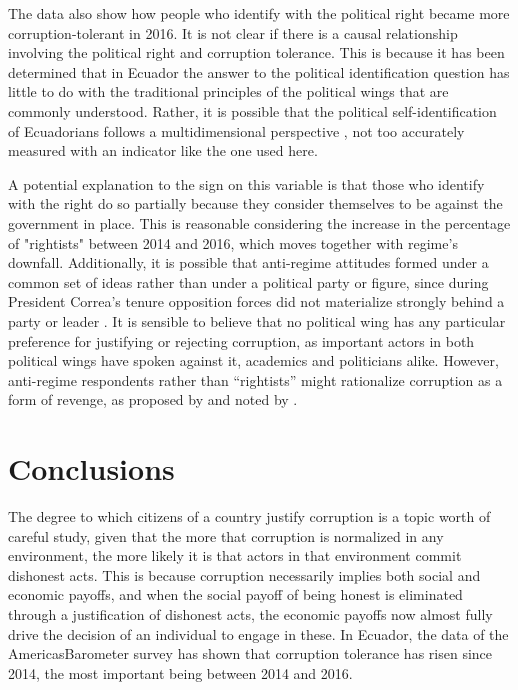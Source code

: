 \documentclass[12pt,a4]{article}\usepackage[]{graphicx}\usepackage[]{xcolor}
\begin{document}
The data also show how people who identify with the political right became more corruption-tolerant in 2016. It is not clear if there is a causal relationship involving the political right and corruption tolerance. This is because it has been determined that in Ecuador the answer to the political identification question has little to do with the traditional principles of the political wings that are commonly understood. Rather, it is possible that the political self-identification of Ecuadorians follows a multidimensional perspective \parencite{Moncagatta.2020b}, not too accurately measured with an indicator like the one used here. 

A potential explanation to the sign on this variable is that those who identify with the right do so partially because they consider themselves to be against the government in place. This is reasonable considering the increase in the percentage of "rightists" between 2014 and 2016, which moves together with regime's downfall. Additionally, it is possible that anti-regime attitudes formed under a common set of ideas rather than under a political party or figure, since during President Correa's tenure opposition forces did not materialize strongly behind a party or leader \parencite{Melendez.2017}. It is sensible to believe that no political wing has any particular preference for justifying or rejecting corruption, as important actors in both political wings have spoken against it, academics \parencite{Holcombe.2015} and politicians \parencite{Morris.2021} alike. However, anti-regime respondents rather than \enquote{rightists} might rationalize corruption as a form of revenge, as proposed by \textcite{Ashforth.2003} and noted by \textcite{Adoum.2000}.










\section{Conclusions}

The degree to which citizens of a country justify corruption is a topic worth of careful study, given that the more that corruption is normalized in any environment, the more likely it is that actors in that environment commit dishonest acts. This is because corruption necessarily implies both social and economic payoffs, and when the social payoff of being honest is eliminated through a justification of dishonest acts, the economic payoffs now almost fully drive the decision of an individual to engage in these. In Ecuador, the data of the AmericasBarometer survey has shown that corruption tolerance has risen since 2014, the most important being between 2014 and 2016.
\end{document}
